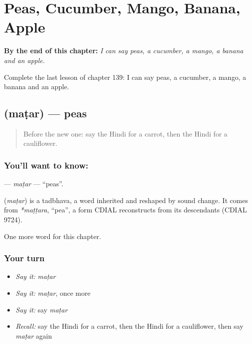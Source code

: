 
\chapter{Peas, Cucumber, Mango, Banana, Apple}
\label{ch:hi-peas-cucumber-mango-banana-apple}

\begin{chapteropening}
\textbf{By the end of this chapter:} \emph{I can say peas, a cucumber, a mango, a banana and an apple.}

Complete the last lesson of chapter 139: I can say peas, a cucumber, a mango, a banana and an apple.
\end{chapteropening}

\section[\texorpdfstring{\hi{मटर} (maṭar)}{मटर (maṭar)}]{ (maṭar) — peas}

\label{lesson:HI-C139-matar}



\begin{quote}
Before the new one: say the Hindi for a carrot, then the Hindi for a cauliflower.
\end{quote}

\subsection*{You'll want to know: }
\textbf{} — \emph{maṭar} — \textquotedblleft{}peas\textquotedblright{}.

\begin{cousinweb}
\textbf{} (\emph{maṭar}) is a tadbhava, a word inherited and reshaped by sound change. It comes from \emph{*maṭṭara}, \textquotedblleft{}pea\textquotedblright{}, a form CDIAL reconstructs from its descendants (CDIAL 9724).
\end{cousinweb}

\begin{grammarlens}[title={What you've built}]
One more word for this chapter.
\end{grammarlens}

\subsection*{Your turn}
\begin{itemize}
\raggedright
  \item \emph{Say it:} \emph{maṭar}
  \item \emph{Say it:} \emph{maṭar}, once more
  \item \emph{Say it:} say \emph{maṭar}
  \item \emph{Recall:} say the Hindi for a carrot, then the Hindi for a cauliflower, then say \emph{maṭar} again
\end{itemize}

